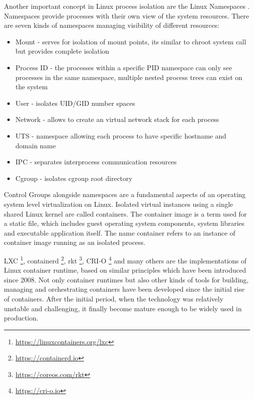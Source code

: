 \documentclass[
  digital, %
  twoside, %
  table,   %
  lof,     %
  lot,     %
]{fithesis3}
\begin{document}
Another important concept in Linux process isolation are the Linux Namespaces \cite{namespaces}. Namespaces provide processes with their own view of the system resources. There are seven kinds of namespaces managing visibility of different resources:
\begin{itemize}
  \item Mount - serves for isolation of mount points, its similar to chroot system call but provides complete isolation
  \item Process ID - the processes within a specific PID namespace can only see processes in the same namespace, multiple nested process trees can exist on the system
  \item User - isolates UID/GID number spaces
  \item Network - allows to create an virtual network stack for each process
  \item UTS - namespace allowing each process to have specific hostname and domain name
  \item IPC - separates interprocess communication resources
  \item Cgroup - isolates cgroup root directory
\end{itemize}

Control Groups alongside namespaces are a fundamental aspects of an operating system level virtualization on Linux. Isolated virtual instances using a single shared Linux kernel are called containers. The container image is a term used for a static file, which includes guest operating system components, system libraries and executable application itself. The name container refers to an instance of container image running as an isolated process.

LXC \footnote{\url{https://linuxcontainers.org/lxc}}, containerd \footnote{\url{https://containerd.io}}, rkt \footnote{\url{https://coreos.com/rkt}}, CRI-O \footnote{\url{https://cri-o.io}} and many others are the implementations of Linux container runtime, based on similar principles which have been introduced since 2008. Not only container runtimes but also other kinds of tools for building, managing and orchestrating containers have been developed since the initial rise of containers. After the initial period, when the technology was relatively unstable and challenging, it finally become mature enough to be widely used in production.
\end{document}
